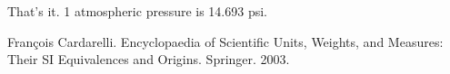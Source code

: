 \documentclass[a6paper]{article}
\begin{document}
That's it. 1 atmospheric pressure is 14.693 psi.
\addtocounter{footnote}{-1}

\begin{thebibliography}{00}
     Fran{\c c}ois Cardarelli. Encyclopaedia of Scientific Units, Weights, and Measures: Their SI Equivalences and Origins. Springer. 2003.
\end{thebibliography}
\end{document}
